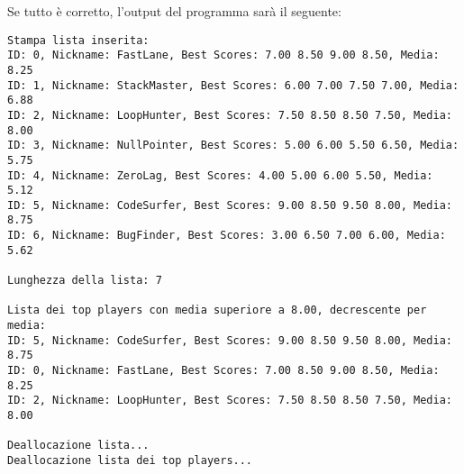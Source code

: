 \documentclass[12pt]{article}
\begin{document}
\newpage
Se tutto \`e corretto, l'output del programma sar\`a il seguente:
%
\begin{mdframed}[backgroundcolor=verylightgray] 
\begin{verbatim}
Stampa lista inserita:
ID: 0, Nickname: FastLane, Best Scores: 7.00 8.50 9.00 8.50, Media: 8.25
ID: 1, Nickname: StackMaster, Best Scores: 6.00 7.00 7.50 7.00, Media: 6.88
ID: 2, Nickname: LoopHunter, Best Scores: 7.50 8.50 8.50 7.50, Media: 8.00
ID: 3, Nickname: NullPointer, Best Scores: 5.00 6.00 5.50 6.50, Media: 5.75
ID: 4, Nickname: ZeroLag, Best Scores: 4.00 5.00 6.00 5.50, Media: 5.12
ID: 5, Nickname: CodeSurfer, Best Scores: 9.00 8.50 9.50 8.00, Media: 8.75
ID: 6, Nickname: BugFinder, Best Scores: 3.00 6.50 7.00 6.00, Media: 5.62

Lunghezza della lista: 7

Lista dei top players con media superiore a 8.00, decrescente per media:
ID: 5, Nickname: CodeSurfer, Best Scores: 9.00 8.50 9.50 8.00, Media: 8.75
ID: 0, Nickname: FastLane, Best Scores: 7.00 8.50 9.00 8.50, Media: 8.25
ID: 2, Nickname: LoopHunter, Best Scores: 7.50 8.50 8.50 7.50, Media: 8.00

Deallocazione lista...
Deallocazione lista dei top players...
\end{verbatim}
\end{mdframed}
\end{document}
